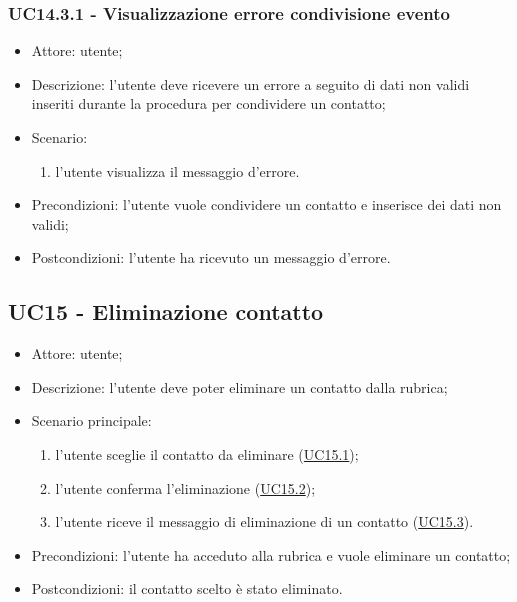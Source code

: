 \subsubsection{UC14.3.1 - Visualizzazione errore condivisione evento} \label{sec: UC14.3.1}
\begin{itemize}
    \item Attore: utente;
    \item Descrizione: l'utente deve ricevere un errore a seguito di dati non validi inseriti durante la procedura per condividere un contatto;
    \item Scenario:
        \begin{enumerate}
        \item l'utente visualizza il messaggio d'errore.
        \end{enumerate}
    
    \item Precondizioni: l'utente vuole condividere un contatto e inserisce dei dati non validi;
    \item Postcondizioni: l'utente ha ricevuto un messaggio d'errore.
\end{itemize}



\subsection{UC15 - Eliminazione contatto}
\begin{itemize}
    \item Attore: utente;
    \item Descrizione: l'utente deve poter eliminare un contatto dalla rubrica;
    \item Scenario principale:
        \begin{enumerate}
        \item l'utente sceglie il contatto da eliminare (\hyperref[sec: UC15.1]{UC15.1});
        \item l'utente conferma l'eliminazione (\hyperref[sec: UC15.2]{UC15.2});
        \item l'utente riceve il messaggio di eliminazione di un contatto (\hyperref[sec: UC15.3]{UC15.3}).
        \end{enumerate}
    \item Precondizioni: l'utente ha acceduto alla rubrica e vuole eliminare un contatto;
    \item Postcondizioni: il contatto scelto è stato eliminato.
\end{itemize}

